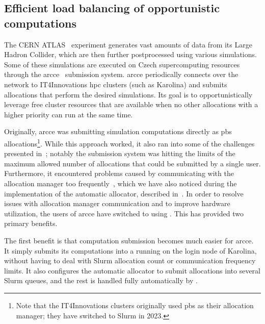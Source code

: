 \subsection{Efficient load balancing of opportunistic computations}
The CERN ATLAS~\cite{atlas} experiment generates vast amounts of data from its Large
Hadron Collider, which are then further postprocessed using various simulations. Some of these
simulations are executed on Czech supercomputing resources through the
\gls{arcce}~\cite{atlas-it4i-1} submission system. \gls{arcce}
periodically connects over the network to IT4Innovations \gls{hpc} clusters (such as
Karolina) and submits allocations that perform the desired simulations. Its goal is to
opportunistically leverage free cluster resources that are available when no other allocations with
a higher priority can run at the same time.

Originally, \gls{arcce} was submitting simulation computations directly as
\gls{pbs} allocations\footnote{Note that the IT4Innovations clusters originally used \gls{pbs} as their allocation
manager; they have switched to Slurm in 2023.}. While this approach worked, it also ran
into some of the challenges presented in~; notably the submission system was
hitting the limits of the maximum allowed number of allocations that could be submitted by a single
user. Furthermore, it encountered problems caused by communicating with the allocation manager too
frequently~\cite{atlas-it4i-2}, which we have also noticed during the implementation of the
\hyperqueue{} automatic allocator, described in~. In order to
resolve issues with allocation manager communication and to improve hardware utilization, the users
of \gls{arcce} have switched to using \hyperqueue{}. This has provided two
primary benefits.

The first benefit is that computation submission becomes much easier for \gls{arcce}.
It simply submits its computations into a \hyperqueue{} running on the login node of
Karolina, without having to deal with Slurm allocation count or communication frequency limits. It
also configures the automatic allocator to submit allocations into several Slurm queues, and the
rest is handled fully automatically by \hyperqueue{}.

